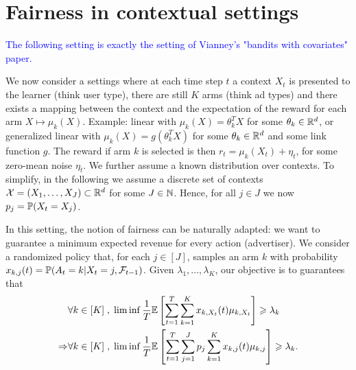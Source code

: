 \section{Fairness in contextual settings}

\textcolor{blue}{The following setting is exactly the setting of Vianney's "bandits with covariates" paper.}

We now consider a settings where at each time step $t$ a context $X_t$ is presented to the learner (think user type), there are still $K$ arms (think ad types) and there exists a mapping between the context and the expectation of the reward for each arm $X \mapsto \mu_k(X)$. Example: linear with $\mu_k(X)=\theta_k^T X$ for some $\theta_k \in \mathbb{R}^d$, or generalized linear with $\mu_k(X)=g(\theta_k^T X)$ for some $\theta_k \in \mathbb{R}^d$ and some link function $g$. The reward if arm $k$ is selected is then $r_t=\mu_k(X_t)+\eta_t$, for some zero-mean noise $\eta_t$. We further assume a known distribution over contexts. To simplify, in the following we assume a discrete set of contexts $\mathcal{X}=(X_1,\dots, X_J) \subset \mathbb{R}^d$ for some $J\in \mathbb{N}$. Hence, for all $j \in J$ we now $p_j = \mathbb{P}(X_t=X_j)$.

In this setting, the notion of fairness can be naturally adapted: we want to guarantee a minimum expected revenue for every action (advertiser). We consider a randomized policy that, for each $j \in [J]$, samples an arm $k$ with probability $x_{k, j}(t) = \mathbb{P}(A_t=k|X_t=j, \mathcal{F}_{t-1})$. Given $\lambda_1, \dots, \lambda_K$, our objective is to guarantees that 
\begin{align*}
&\forall k \in [K]\;, \; \liminf \frac{1}{T}\mathbb{E}\left[\sum_{t=1}^T \sum_{k=1}^K x_{k,X_t}(t)\mu_{k, X_t}\right] \geqslant \lambda_k\\ \Rightarrow &\forall k \in [K]\;, \; \liminf \frac{1}{T}\mathbb{E}\left[\sum_{t=1}^T \sum_{j=1}^J p_j \sum_{k=1}^K x_{k,j}(t)\mu_{k, j}\right] \geqslant \lambda_k . \end{align*}


